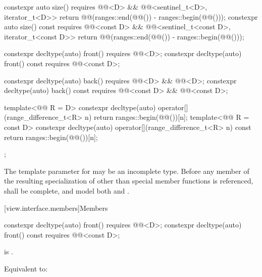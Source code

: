 \begin{codeblock}
{{    constexpr auto size() requires @@<D> &&
      @@<sentinel_t<D>, iterator_t<D>> {
        return @@(ranges::end(@@()) - ranges::begin(@@()));
      }
    constexpr auto size() const requires @@<const D> &&
      @@<sentinel_t<const D>, iterator_t<const D>> {
        return @@(ranges::end(@@()) - ranges::begin(@@()));
      }

    constexpr decltype(auto) front() requires @@<D>;
    constexpr decltype(auto) front() const requires @@<const D>;

    constexpr decltype(auto) back() requires @@<D> && @@<D>;
    constexpr decltype(auto) back() const
      requires @@<const D> && @@<const D>;

    template<@@ R = D>
      constexpr decltype(auto) operator[](range_difference_t<R> n) {
        return ranges::begin(@@())[n];
      }
    template<@@ R = const D>
      constexpr decltype(auto) operator[](range_difference_t<R> n) const {
        return ranges::begin(@@())[n];
      }
  };
}
\end{codeblock}

\pnum
The template parameter  for  may be an
incomplete type. Before any member of the resulting specialization of
 other than special member functions
is referenced,  shall be complete, and
model both  and .

[view.interface.members]{Members}

%
\begin{itemdecl}
constexpr decltype(auto) front() requires @@<D>;
constexpr decltype(auto) front() const requires @@<const D>;
\end{itemdecl}

\begin{itemdescr}
\pnum
\expects
{} is .

\pnum
\effects
Equivalent to: 
\end{itemdescr}

